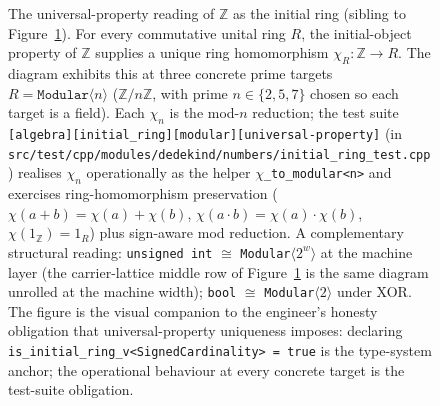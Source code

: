 \documentclass[11pt, a4paper]{report}
\begin{document}
\begin{figure}[ht]
\label{fig:carrier-lattice}
\end{figure}

\begin{figure}[ht]
\centering
{}
\caption{The universal-property reading of $\mathbb{Z}$ as the initial ring (sibling to Figure~\ref{fig:carrier-lattice}). For every commutative unital ring $R$, the initial-object property of $\mathbb{Z}$ supplies a unique ring homomorphism $\chi_R : \mathbb{Z} \to R$. The diagram exhibits this at three concrete prime targets $R = \texttt{Modular}\langle n\rangle$ ($\mathbb{Z}/n\mathbb{Z}$, with prime $n \in \{2, 5, 7\}$ chosen so each target is a field). Each $\chi_n$ is the mod-$n$ reduction; the test suite \texttt{[algebra][initial\_ring][modular][universal-property]} (in \texttt{src/test/cpp/modules/dedekind/numbers/initial\_ring\_test.cpp}) realises $\chi_n$ operationally as the helper \texttt{$\chi$\_to\_modular<n>} and exercises ring-homomorphism preservation ($\chi(a + b) = \chi(a) + \chi(b)$, $\chi(a \cdot b) = \chi(a) \cdot \chi(b)$, $\chi(1_\mathbb{Z}) = 1_R$) plus sign-aware mod reduction. A complementary structural reading: \texttt{unsigned~int} $\cong$ \texttt{Modular}$\langle 2^w\rangle$ at the machine layer (the carrier-lattice middle row of Figure~\ref{fig:carrier-lattice} is the same diagram unrolled at the machine width); \texttt{bool} $\cong$ \texttt{Modular}$\langle 2\rangle$ under XOR. The figure is the visual companion to the engineer's honesty obligation that universal-property uniqueness imposes: declaring \texttt{is\_initial\_ring\_v<SignedCardinality>~=~true} is the type-system anchor; the operational behaviour at every concrete target is the test-suite obligation.}
\label{fig:initial-ring-modular}
\end{figure}
\end{document}
